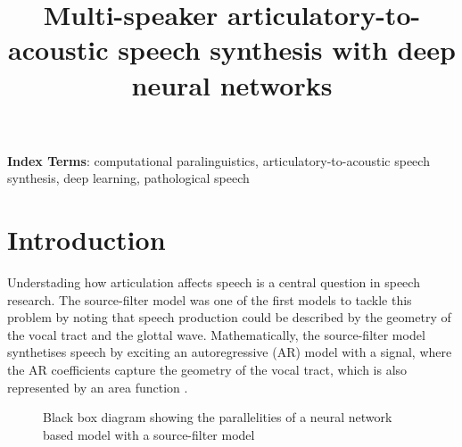 \documentclass[a4paper]{article}
\title{Multi-speaker articulatory-to-acoustic speech synthesis with
deep neural networks}
\begin{document}
\maketitle
% 
\begin{abstract}
  \blindtext[1]
\end{abstract}
\noindent\textbf{Index Terms}: computational paralinguistics, articulatory-to-acoustic
speech synthesis, deep learning, pathological speech

\section{Introduction}

Understading how articulation affects speech is a central question in speech
research. The source-filter model was one of the first models to tackle this
problem by noting that speech production could be described by
the geometry of the vocal tract and the glottal wave. Mathematically,
the source-filter model synthetises speech by exciting an autoregressive (AR) model with a
signal, where the AR coefficients capture the geometry of the
vocal tract, which is also represented by an area function \cite{Benesty2009}. 

\begin{figure}[t]
  \begin{center}

 \caption{Black box diagram showing the parallelities of a neural network
   based model with a source-filter model}
  \label{fig1}
    \end{center}
  \end{figure}
\end{document}
